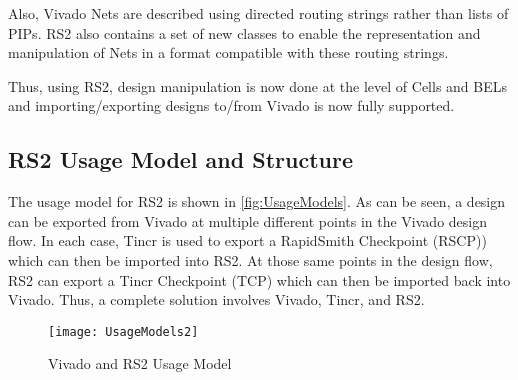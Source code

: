 Also, Vivado Nets are described using directed routing strings rather than lists
of PIPs.  RS2 also contains a set of new classes to enable the representation
and manipulation of Nets in a format compatible with these routing strings.

Thus, using RS2, design manipulation is now done at the level of Cells and BELs
and importing/exporting designs to/from Vivado is now fully supported.

\subsection{RS2 Usage Model and Structure}
The usage model for RS2 is shown in \autoref{fig:UsageModels}.  As can be
seen, a design can be exported from Vivado at multiple different points in the
Vivado design flow.  In each case, Tincr is used to export a RapidSmith
Checkpoint (RSCP)) which can then be imported into RS2.  At those same points in
the design flow, RS2 can export a Tincr Checkpoint (TCP) which can then be
imported back into Vivado.
Thus, a complete solution involves Vivado, Tincr, and RS2.

\begin{figure}[htb]
\centering
\texttt{[image: UsageModels2]}
\caption{Vivado and RS2 Usage Model}
\label{fig:UsageModels}
\end{figure} 
